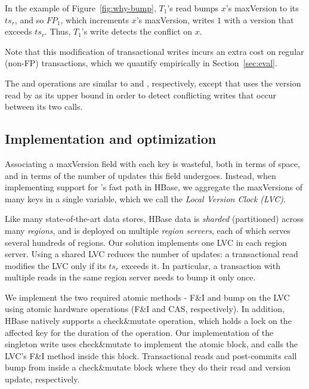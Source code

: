 In the example of Figure~\ref{fig:why-bump}, $T_1$'s read bumps $x$'s {maxVersion} to its $ts_r$, 
and so $FP_1$, which increments $x$'s maxVersion, writes $1$ with a version that exceeds $ts_r$.
Thus, $T_1$'s write  detects the conflict on $x$. 

 Note that this modification of transactional writes incurs an extra cost on
 regular (non-FP) transactions, which we quantify empirically in Section~\ref{sec:eval}.  

The  and  operations are  similar to  and , 
respectively, except that  uses the version read by  as its upper bound
in order to detect conflicting writes that occur between its two calls.

\subsection{Implementation and optimization}
\label{ssec:fast-impl}

Associating a maxVersion field with each key is wasteful,
both in terms of space, and in terms of the number of updates this field undergoes.
Instead, when implementing support for \sys's fast path in HBase, we aggregate the maxVersions of many keys in a single variable, 
which we call the \emph{Local Version Clock (LVC)}.

Like many state-of-the-art data stores, HBase data is \emph{sharded} (partitioned) 
across many \emph{regions}, and is deployed on multiple  \emph{region servers}, each of which serves
several hundreds of regions. Our solution implements one LVC in each region server. 
Using a shared LVC reduces the number of updates:  
a transactional read modifies the LVC only if its $ts_r$ exceeds it. In particular, 
a transaction with multiple reads in the same region server needs to bump it only once. 

We implement the two required atomic methods - F\&I and bump on the LVC using atomic hardware operations (F\&I and CAS, respectively). 
In addition, 
HBase   natively supports  a check\&mutate operation, which holds a lock on the affected key for the duration of the operation.
Our implementation of the singleton write uses  check\&mutate to implement the atomic block, and calls the LVC's F\&I method inside this block.
Transactional reads and post-commits call bump from inside a check\&mutate  block where they do their read and version update, respectively. 

